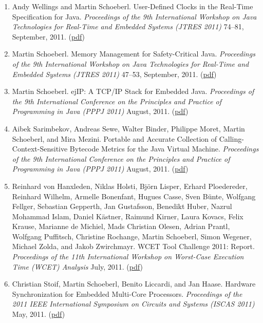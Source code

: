 \begin{enumerate}
\item Andy Wellings and Martin Schoeberl.
 User-Defined Clocks in the Real-Time Specification for Java.
 \emph{Proceedings of the 9th International Workshop on Java Technologies for Real-Time and Embedded Systems (JTRES 2011)} 74--81, September, 2011.
(\href{http://www.jopdesign.com/doc/udclocks.pdf}{pdf})

\item Martin Schoeberl.
 Memory Management for Safety-Critical Java.
 \emph{Proceedings of the 9th International Workshop on Java Technologies for Real-Time and Embedded Systems (JTRES 2011)} 47--53, September, 2011.
(\href{http://www.jopdesign.com/doc/scjscopes.pdf}{pdf})

\item Martin Schoeberl.
 ejIP: A TCP/IP Stack for Embedded Java.
 \emph{Proceedings of the 9th International Conference on the Principles and Practice of Programming in Java (PPPJ 2011)} August, 2011.
(\href{http://www.jopdesign.com/doc/ejip.pdf}{pdf})

\item Aibek Sarimbekov, Andreas Sewe, Walter Binder, Philippe Moret, Martin Schoeberl, and Mira Mezini.
 Portable and Accurate Collection of Calling-Context-Sensitive Bytecode Metrics for the Java Virtual Machine.
 \emph{Proceedings of the 9th International Conference on the Principles and Practice of Programming in Java (PPPJ 2011)} August, 2011.
(\href{http://www.jopdesign.com/doc/jp2pppj2011.pdf}{pdf})

\item Reinhard von Hanxleden, Niklas Holsti, Bj{\"o}rn Lisper, Erhard Ploedereder, Reinhard Wilhelm, Armelle Bonenfant, Hugues Casse, Sven B{\"u}nte, Wolfgang Fellger, Sebastian Gepperth, Jan Gustafsson, Benedikt Huber, Nazrul Mohammad Islam, Daniel K{\"a}stner, Raimund Kirner, Laura Kovacs, Felix Krause, Marianne de Michiel, Mads Christian Olesen, Adrian Prantl, Wolfgang Puffitsch, Christine Rochange, Martin Schoeberl, Simon Wegener, Michael Zolda, and Jakob Zwirchmayr.
 WCET Tool Challenge 2011: Report.
 \emph{Proceedings of the 11th International Workshop on Worst-Case Execution Time (WCET) Analysis} July, 2011.
(\href{http://www.jopdesign.com/doc/wcc2011.pdf}{pdf})

\item Christian Stoif, Martin Schoeberl, Benito Liccardi, and Jan Haase.
 Hardware Synchronization for Embedded Multi-Core Processors.
 \emph{Proceedings of the 2011 IEEE International Symposium on Circuits and Systems (ISCAS 2011)} May, 2011.
(\href{http://www.jopdesign.com/doc/SynMCPs.pdf}{pdf})


\end{enumerate}
